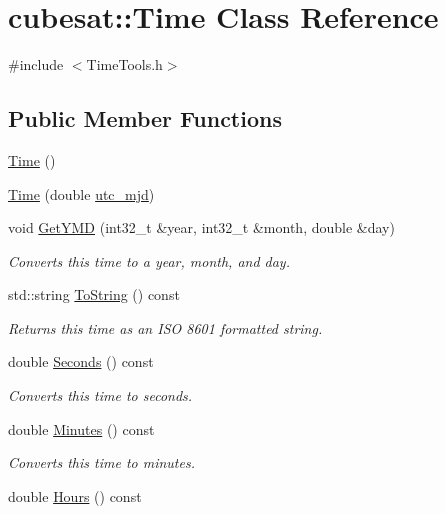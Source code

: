 \hypertarget{classcubesat_1_1Time}{}\section{cubesat\+:\+:Time Class Reference}
\label{classcubesat_1_1Time}


{\ttfamily \#include $<$Time\+Tools.\+h$>$}

\subsection*{Public Member Functions}
\begin{DoxyCompactItemize}
\item 
\hyperlink{classcubesat_1_1Time_ab355ab7ba4f12dce3e737447dbc1ffba}{Time} ()
\item 
\hyperlink{classcubesat_1_1Time_a1a0e41b512545ca8cbbfcb260efd692c}{Time} (double \hyperlink{classcubesat_1_1Time_a8b8595226e81cc29bdb5d6b32d9a188c}{utc\+\_\+mjd})
\item 
void \hyperlink{classcubesat_1_1Time_ad0620b55df5e9e7b0dd380a77ad966dc}{Get\+Y\+MD} (int32\+\_\+t \&year, int32\+\_\+t \&month, double \&day)
\begin{DoxyCompactList}\small\item\em Converts this time to a year, month, and day. \end{DoxyCompactList}\item 
std\+::string \hyperlink{classcubesat_1_1Time_acd77b6ff171d0961af6b78c2c7c6ffa4}{To\+String} () const
\begin{DoxyCompactList}\small\item\em Returns this time as an I\+SO 8601 formatted string. \end{DoxyCompactList}\item 
double \hyperlink{classcubesat_1_1Time_ad54d680f9f2321e766179135bf3ce31a}{Seconds} () const
\begin{DoxyCompactList}\small\item\em Converts this time to seconds. \end{DoxyCompactList}\item 
double \hyperlink{classcubesat_1_1Time_a41ae440add3b14a482b24ca384343e7a}{Minutes} () const
\begin{DoxyCompactList}\small\item\em Converts this time to minutes. \end{DoxyCompactList}\item 
double \hyperlink{classcubesat_1_1Time_a2f42461d185c800501864e9f01d2cdb6}{Hours} () const

\end{DoxyCompactItemize}
